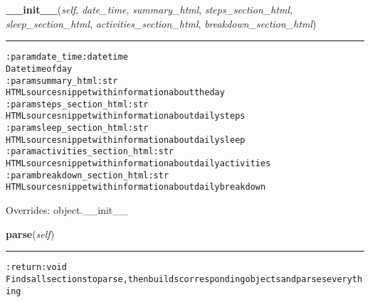 \hspace{.8\funcindent}\begin{boxedminipage}{\funcwidth}

    \raggedright \textbf{\_\_init\_\_}(\textit{self}, \textit{date\_time}, \textit{summary\_html}, \textit{steps\_section\_html}, \textit{sleep\_section\_html}, \textit{activities\_section\_html}, \textit{breakdown\_section\_html})

    \vspace{-1.5ex}

    \rule{\textwidth}{0.5\fboxrule}
\setlength{\parskip}{2ex}
\begin{alltt}

:param date\_time: datetime
    Datetime of day
:param summary\_html: str
    HTML source snippet with information about the day
:param steps\_section\_html: str
    HTML source snippet with information about daily steps
:param sleep\_section\_html: str
    HTML source snippet with information about daily sleep
:param activities\_section\_html: str
    HTML source snippet with information about daily activities
:param breakdown\_section\_html: str
    HTML source snippet with information about daily breakdown
\end{alltt}

\setlength{\parskip}{1ex}
      Overrides: object.\_\_init\_\_

    \end{boxedminipage}

    \label{pygce:models:garmin:timeline:GCDayTimeline:parse}

    \vspace{0.5ex}

\hspace{.8\funcindent}\begin{boxedminipage}{\funcwidth}

    \raggedright \textbf{parse}(\textit{self})

    \vspace{-1.5ex}

    \rule{\textwidth}{0.5\fboxrule}
\setlength{\parskip}{2ex}
\begin{alltt}

:return: void
    Finds all sections to parse, then builds corresponding objects and parses everything
\end{alltt}

\setlength{\parskip}{1ex}
    \end{boxedminipage}

